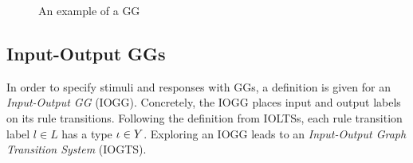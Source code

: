 \begin{figure}[ht]
  \begin{center}
    \hspace{20px}
    \hspace{20px}
    
    \hspace{20px}
    \hspace{20px}
  \end{center}
  \caption{An example of a GG}
  \label{fig:gts}
\end{figure}

\subsection{Input-Output GGs}
In order to specify stimuli and responses with GGs, a definition is given for an \textit{Input-Output GG} (IOGG). Concretely, the IOGG places input and output labels on its rule transitions. Following the definition from IOLTSs, each rule transition label $l \in L$ has a type $\iota \in Y$. Exploring an IOGG leads to an \textit{Input-Output Graph Transition System} (IOGTS).
